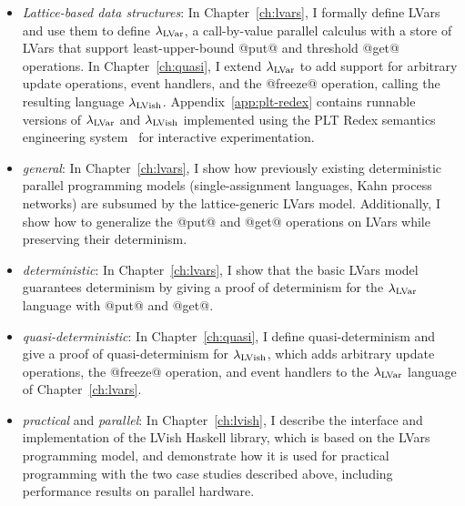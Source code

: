 \begin{itemize}
  \item \emph{Lattice-based data structures}: In
    Chapter~\ref{ch:lvars}, I formally define LVars and use them to
    define $\lambda_{\textrm{LVar}}$, a call-by-value parallel calculus with a
    store of LVars that support least-upper-bound @put@ and threshold
    @get@ operations. In Chapter~\ref{ch:quasi}, I extend
    $\lambda_{\textrm{LVar}}$ to add support for arbitrary update operations,
    event handlers, and the @freeze@ operation, calling the resulting
    language $\lambda_{\textrm{LVish}}$.  Appendix~\ref{app:plt-redex} contains
    runnable versions of $\lambda_{\textrm{LVar}}$ and $\lambda_{\textrm{LVish}}$ implemented
    using the PLT Redex semantics engineering system~\cite{redex-book}
    for interactive experimentation.

  \item \emph{general}: In Chapter~\ref{ch:lvars}, I show how
    previously existing deterministic parallel programming models
    (single-assignment languages, Kahn process networks) are subsumed
    by the lattice-generic LVars model.  Additionally, I show how to
    generalize the @put@ and @get@ operations on LVars while
    preserving their determinism.

  \item \emph{deterministic}: In Chapter~\ref{ch:lvars}, I show that
    the basic LVars model guarantees determinism by giving a proof of
    determinism for the $\lambda_{\textrm{LVar}}$ language with @put@ and @get@.

  \item \emph{quasi-deterministic}: In Chapter~\ref{ch:quasi}, I
    define quasi-determinism and give a proof of quasi-determinism for
    $\lambda_{\textrm{LVish}}$, which adds arbitrary update operations, the
    @freeze@ operation, and event handlers to the $\lambda_{\textrm{LVar}}$
    language of Chapter~\ref{ch:lvars}.

  \item \emph{practical} and \emph{parallel}: In
    Chapter~\ref{ch:lvish}, I describe the interface and
    implementation of the LVish Haskell library, which is based on the
    LVars programming model, and demonstrate how it is used for
    practical programming with the two case studies described above,
    including performance results on parallel hardware.


\end{itemize}

